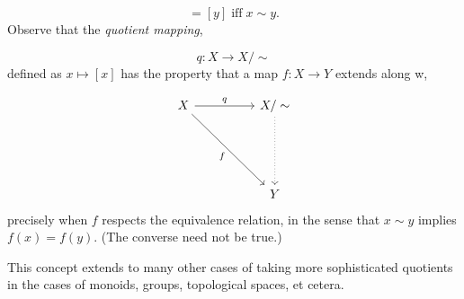 \begin{equation*} 
	[x] = [y] \; \text{iff} \; x \sim y.
\end{equation*}
Observe that the \emph{quotient mapping},

\begin{equation*} 
	q:X \to X/\sim
\end{equation*}
defined as $x \mapsto [x]$ has the property that a map $f:X\to Y$ extends along w,

\begin{equation*} 
	\begin{tikzcd}
		X \arrow[rr, "q"] \arrow[rrddd, "f"'] && X/\sim \arrow[ddd, dotted]\\
		&&\\&&\\
		&& Y
	\end{tikzcd}
\end{equation*}
precisely when $f$ respects the equivalence relation, in the sense that $x \sim y$ implies $f(x) = f(y).$ (The converse need not be true.)

This concept extends to many other cases of taking more sophisticated quotients in the cases of monoids, groups, topological spaces, et cetera.